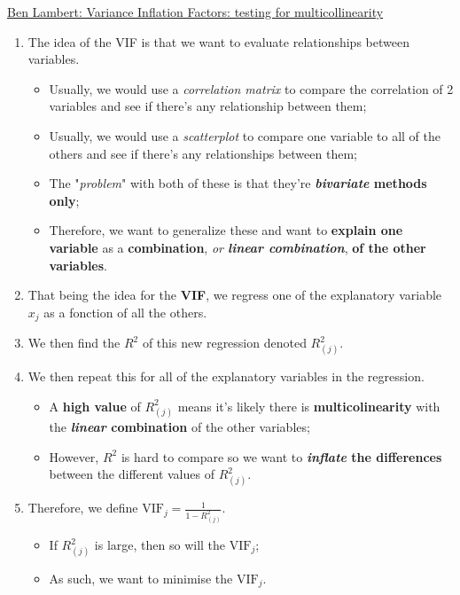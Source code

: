\documentclass[12pt, titlepage, french]{report}
\begin{document}
\begin{YTB_SUMM}{\href{https://www.youtube.com/watch?v=0SBIXgPVex8}{Ben Lambert: Variance Inflation Factors: testing for multicollinearity}}
\begin{enumerate}
	\item	The idea of the VIF is that we want to evaluate relationships between variables.
	\begin{itemize}
		\item	Usually, we would use a \textit{correlation matrix} to compare the correlation of 2 variables and see if there's any relationship between them;
		\item	Usually, we would use a \textit{scatterplot} to compare one variable to all of the others and see if there's any relationships between them;
		\item	The "\textit{problem}" with both of these is that they're \textbf{\textit{bivariate} methods only};
		\item	Therefore, we want to generalize these and want to \textbf{explain one variable} as a \textbf{combination}, \textit{or \textbf{linear combination}}, \textbf{of the other variables}.
	\end{itemize}
	\item	That being the idea for the \textbf{VIF}, we regress one of the explanatory variable $x_{j}$ as a fonction of all the others.
	\item	We then find the $R^{2}$ of this new regression denoted $R^{2}_{(j)}$.
	\item	We then repeat this for all of the explanatory variables in the regression.
	\begin{itemize}
		\item	A \textbf{high value} of $R^{2}_{(j)}$ means it's likely there is \textbf{multicolinearity} with the \textbf{\textit{linear} combination} of the other variables;
		\item	However, $R^{2}$ is hard to compare so we want to \textbf{\textit{inflate} the differences} between the different values of $R^{2}_{(j)}$.
	\end{itemize}
	\item	Therefore, we define $\text{VIF}_{j} = \frac{1}{1 - R^{2}_{(j)}}$.
	\begin{itemize}
		\item	If $R^{2}_{(j)}$ is large, then so will the $\text{VIF}_{j}$; 
		\item	As such, we want to minimise the $\text{VIF}_{j}$.
	\end{itemize}
\end{enumerate}
\end{YTB_SUMM}
\end{document}

